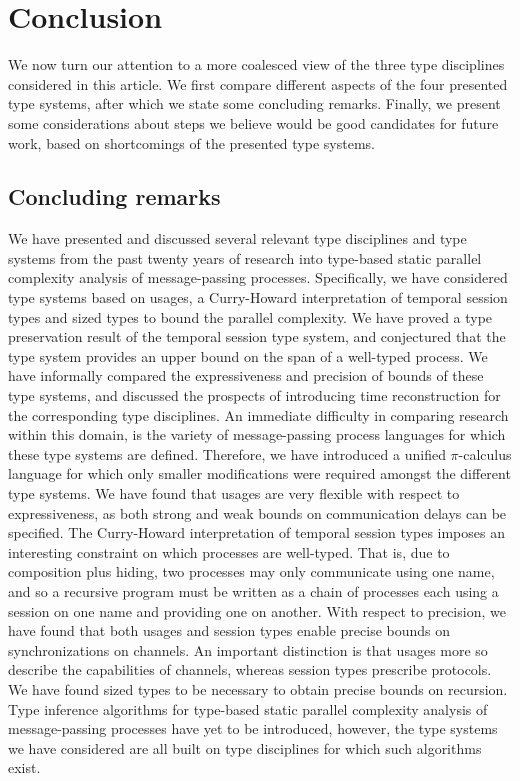 \chapter{Conclusion}\label{sec:conc}

We now turn our attention to a more coalesced view of the three type disciplines considered in this article. We first compare different aspects of the four presented type systems, after which we state some concluding remarks. Finally, we present some considerations about steps we believe would be good candidates for future work, based on shortcomings of the presented type systems.



\section{Concluding remarks}
We have presented and discussed several relevant type disciplines and type systems from the past twenty years of research into type-based static parallel complexity analysis of message-passing processes. Specifically, we have considered type systems based on usages, a Curry-Howard interpretation of temporal session types and sized types to bound the parallel complexity. We have proved a type preservation result of the temporal session type system, and conjectured that the type system provides an upper bound on the span of a well-typed process. We have informally compared the expressiveness and precision of bounds of these type systems, and discussed the prospects of introducing time reconstruction for the corresponding type disciplines. An immediate difficulty in comparing research within this domain, is the variety of message-passing process languages for which these type systems are defined. Therefore, we have introduced a unified $\pi$-calculus language for which only smaller modifications were required amongst the different type systems. We have found that usages are very flexible with respect to expressiveness, as both strong and weak bounds on communication delays can be specified. The Curry-Howard interpretation of temporal session types imposes an interesting constraint on which processes are well-typed. That is, due to composition plus hiding, two processes may only communicate using one name, and so a recursive program must be written as a chain of processes each using a session on one name and providing one on another. With respect to precision, we have found that both usages and session types enable precise bounds on synchronizations on channels. An important distinction is that usages more so describe the capabilities of channels, whereas session types prescribe protocols. We have found sized types to be necessary to obtain precise bounds on recursion. Type inference algorithms for type-based static parallel complexity analysis of message-passing processes have yet to be introduced, however, the type systems we have considered are all built on type disciplines for which such algorithms exist.

